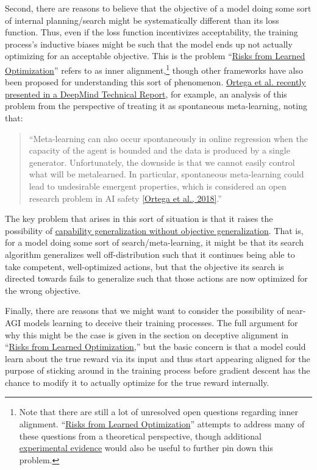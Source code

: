 \documentclass{amsart}
\begin{document}
Second, there are reasons to believe that the objective of a model doing some sort of internal planning/search might be systematically different than its loss function. Thus, even if the loss function incentivizes acceptability, the training process's inductive biases might be such that the model ends up not actually optimizing for an acceptable objective. This is the problem ``\href{https://arxiv.org/abs/1906.01820}{Risks from Learned Optimization}'' refers to as inner alignment,\footnote{Note that there are still a lot of unresolved open questions regarding inner alignment. ``\href{https://arxiv.org/abs/1906.01820}{Risks from Learned Optimization}'' attempts to address many of these questions from a theoretical perspective, though additional \href{https://www.alignmentforum.org/posts/uSdPa9nrSgmXCtdKN/concrete-experiments-in-inner-alignment}{experimental evidence} would also be useful to further pin down this problem.} though other frameworks have also been proposed for understanding this sort of phenomenon. \href{https://arxiv.org/abs/1905.03030}{Ortega et al. recently presented in a DeepMind Technical Report}, for example, an analysis of this problem from the perspective of treating it as spontaneous meta-learning, noting that:
\begin{quote}
    ``Meta-learning can also occur spontaneously in online regression when the capacity of the agent is bounded and the data is produced by a single generator. Unfortunately, the downside is that we cannot easily control what will be metalearned. In particular, spontaneous meta-learning could lead to undesirable emergent properties, which is considered an open research problem in AI safety \href{https://medium.com/@deepmindsafetyresearch/building-safe-artificial-intelligence-52f5f75058f1}{[Ortega et al., 2018]}.''
\end{quote}
The key problem that arises in this sort of situation is that it raises the possibility of \href{https://www.alignmentforum.org/posts/2mhFMgtAjFJesaSYR/2-d-robustness}{capability generalization without objective generalization}. That is, for a model doing some sort of search/meta-learning, it might be that its search algorithm generalizes well off-distribution such that it continues being able to take competent, well-optimized actions, but that the objective its search is directed towards fails to generalize such that those actions are now optimized for the wrong objective.

Finally, there are reasons that we might want to consider the possibility of near-AGI models learning to deceive their training processes. The full argument for why this might be the case is given in the section on deceptive alignment in ``\href{https://arxiv.org/abs/1906.01820}{Risks from Learned Optimization},'' but the basic concern is that a model could learn about the true reward via its input and thus start appearing aligned for the purpose of sticking around in the training process before gradient descent has the chance to modify it to actually optimize for the true reward internally.
\end{document}
